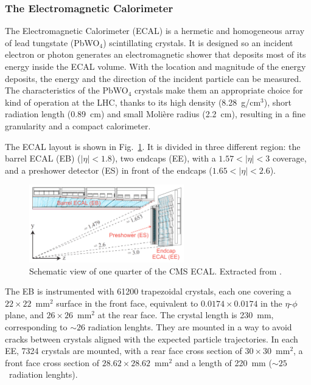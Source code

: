 \documentclass[../main.tex]{subfiles}
\begin{document}
\subsubsection{The Electromagnetic Calorimeter}

The Electromagnetic Calorimeter (ECAL) \cite{intro:exp:ecal} is a hermetic and homogeneous array of lead tungstate (PbWO${}_4$) scintillating crystals. It is designed so an incident electron or photon generates an electromagnetic shower that deposits most of its energy inside the ECAL volume.  With the location and magnitude of the energy deposits, the energy and the direction of the incident particle can be measured. The characteristics of the PbWO${}_4$ crystals make them an appropriate choice for kind of operation at the LHC, thanks to its high density (8.28~g/cm${}^{3}$), short radiation length (0.89~cm) and small Molière radius (2.2~cm), resulting in a fine granularity and a compact calorimeter.

The ECAL layout is shown in Fig.~\ref{intro:fig:ecal}. It is divided in three different region: the barrel ECAL (EB) ($|\eta|<1.8$), two endcaps (EE), with a  $1.57 < |\eta|<3$ coverage, and a preshower detector (ES) in front of the endcaps ($1.65 < |\eta| < 2.6$).


\begin{figure}[h!]
\begin{center}
\includegraphics[width=0.6\textwidth]{Images/ecal}
\end{center}
\caption{Schematic view of one quarter of the CMS ECAL. Extracted from \cite{intro:exp:ecal_layout}.}
\label{intro:fig:ecal}
\end{figure}

The EB is instrumented with 61200 trapezoidal crystals, each one covering a $22\times22$~mm${}^2$ surface in the front face, equivalent to $0.0174\times 0.0174$ in the $\eta$-$\phi$ plane, and $26\times26$~mm${}^2$ at the rear face. The crystal length is 230~mm, corresponding to $\sim26$ radiation lenghts. They are mounted in a way to avoid cracks between crystals aligned with the expected particle trajectories. In each EE, 7324 crystals are mounted, with a rear face cross section of $30\times30$~mm${}^2$, a front face cross section of $28.62\times28.62$~mm${}^2$ and a length of 220~mm ($\sim25$~radiation lenghts).
\end{document}
